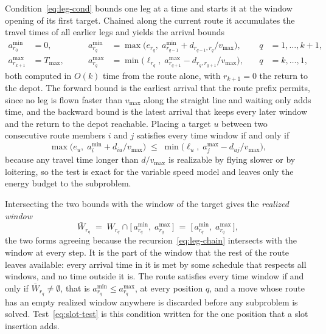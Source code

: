 Condition~\eqref{eq:leg-cond} bounds one leg at a time and starts it at the window opening of its first target. Chained along the current route it accumulates the travel times of all earlier legs and yields the arrival bounds
\begin{equation}\label{eq:leg-chain}
\begin{aligned}
    a^{\min}_{r_0} &= 0, &\qquad
    a^{\min}_{r_q} &= \max\!\bigl( e_{r_q},\; a^{\min}_{r_{q-1}} + d_{r_{q-1}, r_q} / v_{\max} \bigr), &\quad q &= 1, \ldots, k+1, \\
    a^{\max}_{r_{k+1}} &= T_{\max}, &\qquad
    a^{\max}_{r_q} &= \min\!\bigl( \ell_{r_q},\; a^{\max}_{r_{q+1}} - d_{r_q, r_{q+1}} / v_{\max} \bigr), &\quad q &= k, \ldots, 1,
\end{aligned}
\end{equation}
both computed in $O(k)$ time from the route alone, with $r_{k+1} = 0$ the return to the depot. The forward bound is the earliest arrival that the route prefix permits, since no leg is flown faster than $v_{\max}$ along the straight line and waiting only adds time, and the backward bound is the latest arrival that keeps every later window and the return to the depot reachable. Placing a target $u$ between two consecutive route members $i$ and $j$ satisfies every time window if and only if
\begin{equation}\label{eq:slot-test}
    \max\!\bigl( e_u,\; a^{\min}_i + d_{iu} / v_{\max} \bigr)
    \;\le\;
    \min\!\bigl( \ell_u,\; a^{\max}_j - d_{uj} / v_{\max} \bigr),
\end{equation}
because any travel time longer than $d / v_{\max}$ is realizable by flying slower or by loitering, so the test is exact for the variable speed model and leaves only the energy budget to the subproblem.

Intersecting the two bounds with the window of the target gives the \emph{realized window}
\begin{equation}\label{eq:realized-window}
    \bar{W}_{r_q} \;=\; W_{r_q} \cap \bigl[\, a^{\min}_{r_q},\; a^{\max}_{r_q} \,\bigr] \;=\; \bigl[\, a^{\min}_{r_q},\; a^{\max}_{r_q} \,\bigr] ,
\end{equation}
the two forms agreeing because the recursion~\eqref{eq:leg-chain} intersects with the window at every step. It is the part of the window that the rest of the route leaves available: every arrival time in it is met by some schedule that respects all windows, and no time outside it is. The route satisfies every time window if and only if $\bar{W}_{r_q} \neq \emptyset$, that is $a^{\min}_{r_q} \le a^{\max}_{r_q}$, at every position $q$, and a move whose route has an empty realized window anywhere is discarded before any subproblem is solved. Test~\eqref{eq:slot-test} is this condition written for the one position that a slot insertion adds.

